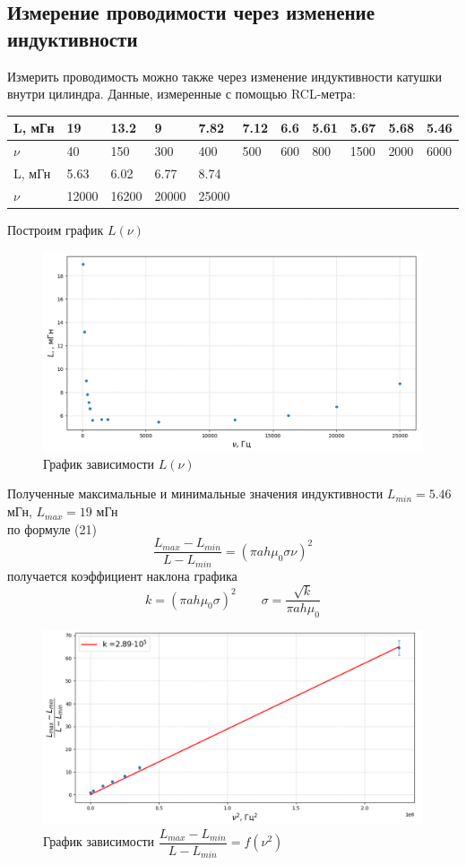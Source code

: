 \documentclass[a4paper,12pt]{article}
\begin{document}
\subsection{Измерение проводимости через изменение индуктивности}
 Измерить проводимость можно также через изменение индуктивности катушки внутри цилиндра. Данные, измеренные с помощью RCL-метра:
 \begin{table}[!ht]
    \centering
    \begin{tabular}{|l|l|l|l|l|l|l|l|l|l|l|}
        \hline
        L, мГн & 19 & 13.2 & 9 & 7.82 & 7.12 & 6.6 & 5.61 & 5.67 & 5.68 & 5.46 \\ \hline
        $\nu$ & 40 & 150 & 300 & 400 & 500 & 600 & 800 & 1500 & 2000 & 6000 \\ \hline
        L, мГн & 5.63 & 6.02 & 6.77 & 8.74 & ~ & ~ & ~ & ~ & ~ & ~ \\ \hline
        $\nu$ & 12000 & 16200 & 20000 & 25000 & ~ & ~ & ~ & ~ & ~ & ~ \\ \hline
    \end{tabular}
 \end{table}
 Построим график $L(\nu)$
    \begin{figure}[H]
    \centering
    \includegraphics[width=1\textwidth]{4_grf}
    \caption{График зависимости $L(\nu)$}
    \label{1.4}
 \end{figure}
 Полученные максимальные и минимальные значения индуктивности $L_{min} = 5.46$ мГн, $L_{max} = 19$ мГн\\
 по формуле (21)
 $$
    \dfrac{L_{max} - L_{min}}{L - L_{min}} = (\pi a h \mu_0 \sigma \nu)^2
 $$
 получается коэффициент наклона графика
 $$
    k = (\pi a h \mu_0 \sigma )^2 \qquad \sigma = \dfrac{\sqrt{k}}{\pi a h \mu_0}
 $$
\begin{figure}[H]
    \centering
    \includegraphics[width=1\textwidth]{5_grf}
    \caption{График зависимости $\dfrac{L_{max} - L_{min}}{L - L_{min}} = f(\nu^2)$}
    \label{1.5}
 \end{figure}
\end{document}
